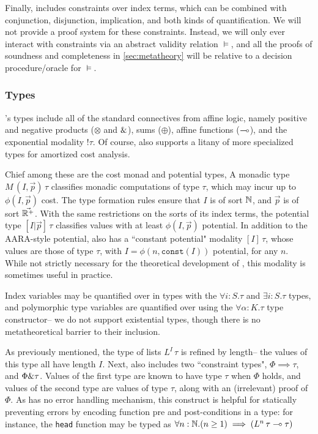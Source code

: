 Finally, \dlambdaamor includes constraints over index terms, which can be combined with conjunction, disjunction, implication, and both kinds of quantification. We will not provide a proof system for these constraints. Instead, we will only ever interact with constraints via an abstract validity relation $\vDash$, and all the proofs of soundness and completeness in \autoref{sec:metatheory} will be relative to a decision procedure/oracle for $\vDash$.

\subsubsection{Types}
\dlambdaamor's types include all of the standard connectives from affine logic, namely positive and negative products ($\otimes$ and $\&$), sums ($\oplus$), affine functions ($\multimap$), and the exponential modality $! \tau$. Of course, \dlambdaamor also supports a litany of more specialized types for amortized cost analysis.

Chief among these are the cost monad and potential types, A monadic type $M \, (I,\vec{p}) \, \tau$ classifies monadic computations of type $\tau$, which may incur up to $\phi(I,\vec{p})$ cost. The type formation rules ensure that $I$ is of sort $\mathbb{N}$, and $\vec{p}$ is of sort $\vec{\mathbb{R}^+}$. With the same restrictions on the sorts of its index terms, the potential type $[I|\vec{p}]\, \tau$ classifies values with at least $\phi(I,\vec{p})$ potential. In addition to the AARA-style potential, \dlambdaamor also has a ``constant potential" modality $[I] \, \tau$, whose values are those of type $\tau$, with $I = \phi(n,\texttt{const}(I))$ potential, for any $n$. While not strictly necessary for the theoretical development of \dlambdaamor, this modality is sometimes useful in practice.

Index variables may be quantified over in types with the $\forall i : S.\tau$ and $\exists i : S.\tau$ types, and polymorphic type variables are quantified over using the $\forall \alpha : K .\tau$ type constructor-- we do not support existential types, though there is no metatheoretical barrier to their inclusion.

As previously mentioned, the type of lists $L^I \, \tau$ is refined by length-- the values of this type all have length $I$. Next, \dlambdaamor also includes two ``constraint types", $\Phi \implies \tau$, and $\Phi \& \tau$. Values of the first type are known to have type $\tau$ when $\Phi$ holds, and values of the second type are values of type $\tau$, along with an (irrelevant) proof of $\Phi$. As \lambdaamor has no error handling mechanism, this construct is helpful for statically preventing errors by encoding function pre and post-conditions in a type: for instance, the \texttt{head} function may be typed as $\forall n : \mathbb{N}. (n \geq 1) \implies (L^n \, \tau \multimap \tau)$


